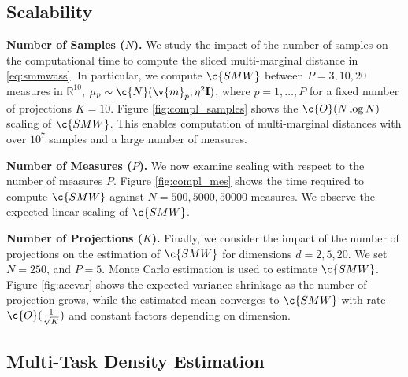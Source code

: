 \documentclass{article}
\begin{document}
\subsection{Scalability}




\textbf{Number of Samples ($N$).} We  study the impact of  the number of samples on the computational time to compute the sliced multi-marginal distance in \eqref{eq:smmwass}. In particular, we compute $\c{SMW}$ between $P=3, 10, 20$ measures in $\mathbb{R}^{10}$, $\mu_p\sim \c{N}(\v{m}_p,\eta^2 \m{I})$, where $p=1,\ldots, P$ for a fixed number of projections $K=10$. 
Figure \ref{fig:compl_samples} shows the   $\c{O}(N\log N)$ scaling of $\c{SMW}$. 
This enables computation of multi-marginal distances with over $10^7$ samples and a large number of measures.

\textbf{Number of Measures ($P$).} We now examine scaling with respect to the number of measures $P$. Figure \ref{fig:compl_mes} shows the time required to compute $\c{SMW}$ against $N=500, 5000, 50000$ measures. We observe the expected linear scaling of $\c{SMW}$.

\textbf{Number of Projections ($K$).} Finally, we consider the impact of the number of projections on the estimation of $\c{SMW}$ for dimensions $d=2,5, 20$. We set $N=250$, and $P=5$. Monte Carlo estimation is used to estimate $\c{SMW}$. Figure \ref{fig:accvar} shows the expected variance shrinkage as the number of projection grows, while the estimated mean converges to $\c{SMW}$ with rate $\c{O}(\frac{1}{\sqrt{K}})$ and constant factors depending on dimension.




\subsection{Multi-Task Density Estimation}
\end{document}
